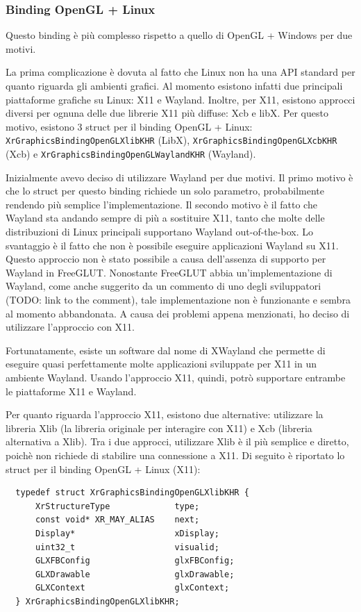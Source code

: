 \documentclass[twoside]{supsistudent}
\begin{document}
\subsubsection{Binding OpenGL + Linux}

Questo binding è più complesso rispetto a quello di OpenGL + Windows per due motivi.

La prima complicazione è dovuta al fatto che Linux non ha una API standard per quanto riguarda gli ambienti grafici. Al momento esistono infatti due principali piattaforme grafiche su Linux: X11 e Wayland. Inoltre, per X11, esistono approcci diversi per ognuna delle due librerie X11 più diffuse: Xcb e libX. Per questo motivo, esistono 3 struct per il binding OpenGL + Linux: \texttt{XrGraphicsBindingOpenGLXlibKHR} (LibX), \texttt{XrGraphicsBindingOpenGLXcbKHR} (Xcb) e \texttt{XrGraphicsBindingOpenGLWaylandKHR} (Wayland).

Inizialmente avevo deciso di utilizzare Wayland per due motivi. Il primo motivo è che lo struct per questo binding richiede un solo parametro, probabilmente rendendo più semplice l'implementazione. Il secondo motivo è il fatto che Wayland sta andando sempre di più a sostituire X11, tanto che molte delle distribuzioni di Linux principali supportano Wayland out-of-the-box. Lo svantaggio è il fatto che non è possibile eseguire applicazioni Wayland su X11. Questo approccio non è stato possibile a causa dell'assenza di supporto per Wayland in FreeGLUT. Nonostante FreeGLUT abbia un'implementazione di Wayland, come anche suggerito da un commento di uno degli sviluppatori (TODO: link to the comment), tale implementazione non è funzionante e sembra al momento abbandonata. A causa dei problemi appena menzionati, ho deciso di utilizzare l'approccio con X11.

Fortunatamente, esiste un software dal nome di XWayland che permette di eseguire quasi perfettamente molte applicazioni sviluppate per X11 in un ambiente Wayland. Usando l'approccio X11, quindi, potrò supportare entrambe le piattaforme X11 e Wayland.

Per quanto riguarda l'approccio X11, esistono due alternative: utilizzare la libreria Xlib (la libreria originale per interagire con X11) e Xcb (libreria alternativa a Xlib). Tra i due approcci, utilizzare Xlib è il più semplice e diretto, poichè non richiede di stabilire una connessione a X11. Di seguito
è riportato lo struct per il binding OpenGL + Linux (X11):

\begin{verbatim}
  typedef struct XrGraphicsBindingOpenGLXlibKHR {
      XrStructureType             type;
      const void* XR_MAY_ALIAS    next;
      Display*                    xDisplay;
      uint32_t                    visualid;
      GLXFBConfig                 glxFBConfig;
      GLXDrawable                 glxDrawable;
      GLXContext                  glxContext;
  } XrGraphicsBindingOpenGLXlibKHR;
\end{verbatim}
\end{document}
